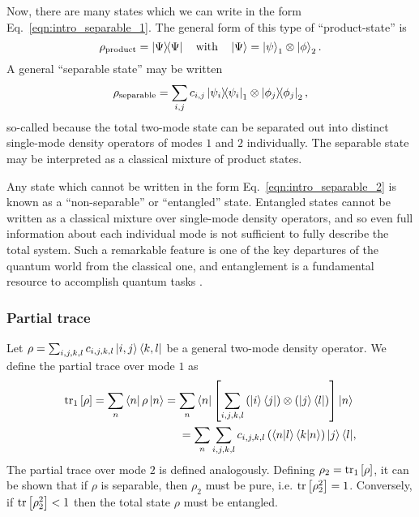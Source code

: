 Now, there are many states which we can write in the form Eq.~\ref{eqn:intro_separable_1}. The general form of this type of ``product-state'' is
\begin{equation}
\rho_{\text{product}} = \dyad{\Psi} \qq{with} \ket{\Psi} = \ket{\psi}_1 \otimes \ket{\phi}_2.
\end{equation}
A general ``separable state'' may be written
\begin{equation}\label{eqn:intro_separable_2}
\rho_{\text{separable}} = \sum_{i, j} c_{i, j} \dyad{\psi_i}_1 \otimes \dyad{\phi_j}_2,
\end{equation}
so-called because the total two-mode state can be separated out into distinct single-mode density operators of modes $1$ and $2$ individually. The separable state may be interpreted as a classical mixture of product states.

Any state which cannot be written in the form Eq.~\ref{eqn:intro_separable_2} is known as a ``non-separable'' or ``entangled'' state. Entangled states cannot be written as a classical mixture over single-mode density operators, and so even full information about each individual mode is not sufficient to fully describe the total system. Such a remarkable feature is one of the key departures of the quantum world from the classical one, and entanglement is a fundamental resource to accomplish quantum tasks \cite{Horodecki2007, Eisert2002}.

\subsubsection{Partial trace}
Let $\rho = \sum_{i, j, k, l} c_{i, j, k, l} \ket{i, j}\bra{k, l}$ be a general two-mode density operator. We define the partial trace over mode $1$ as
\begin{align*}
\tr_1\left[\rho\right] = \sum_n \bra{n}\rho\ket{n} = \sum_n \bra{n} \left[\sum_{i, j, k, l} \left(\ket{i}\bra{j}\right) \otimes \left(\ket{j}\bra{l}\right) \right] \ket{n}& \\
= \sum_n \sum_{i, j, k, l} c_{i, j, k, l} \left(\ip{n}{l} \ip{k}{n} \right) \ket{j}\bra{l}&,
\end{align*}
The partial trace over mode $2$ is defined analogously. Defining $\rho_2 = \tr_1\left[\rho\right]$, it can be shown that if $\rho$ is separable, then $\rho_2$ must be pure, i.e. $\tr\left[\rho_2^2\right]=1$. Conversely, if $\tr\left[\rho_2^2\right] < 1$ then the total state $\rho$ must be entangled.







